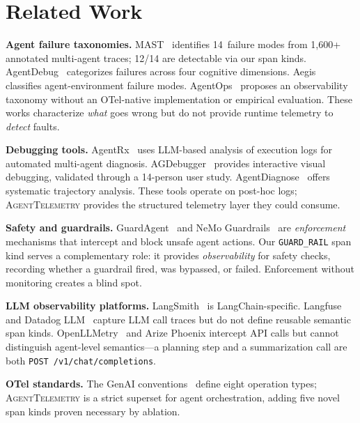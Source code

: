 \documentclass{article}
\begin{document}
\section{Related Work}
\label{sec:related}

\textbf{Agent failure taxonomies.}
MAST~\citep{mast} identifies 14~failure modes from 1,600+ annotated
multi-agent traces; 12/14 are detectable via our span kinds.
AgentDebug~\citep{agentdebug} categorizes failures across four
cognitive dimensions.  Aegis~\citep{aegis} classifies agent-environment
failure modes.  AgentOps~\citep{agentops} proposes an observability
taxonomy without an OTel-native implementation or empirical evaluation.
These works characterize \emph{what} goes wrong but do not provide
runtime telemetry to \emph{detect} faults.

\textbf{Debugging tools.}
AgentRx~\citep{agentrx} uses LLM-based analysis of execution logs for
automated multi-agent diagnosis.
AGDebugger~\citep{agdebugger} provides interactive visual debugging,
validated through a 14-person user study.
AgentDiagnose~\citep{agentdiagnose} offers systematic trajectory
analysis.  These tools operate on post-hoc logs;
\textsc{AgentTelemetry} provides the structured telemetry layer they
could consume.

\textbf{Safety and guardrails.}
GuardAgent~\citep{guardagent} and NeMo Guardrails~\citep{nemo_guardrails}
are \emph{enforcement} mechanisms that intercept and block unsafe agent
actions.  Our \texttt{GUARD\_RAIL} span kind serves a complementary
role: it provides \emph{observability} for safety checks, recording
whether a guardrail fired, was bypassed, or failed.  Enforcement
without monitoring creates a blind spot.

\textbf{LLM observability platforms.}
LangSmith~\citep{langsmith} is LangChain-specific.
Langfuse~\citep{langfuse} and Datadog LLM~\citep{datadog_llm} capture
LLM call traces but do not define reusable semantic span kinds.
OpenLLMetry~\citep{openllmetry} and Arize Phoenix intercept API calls
but cannot distinguish agent-level semantics---a planning step and a
summarization call are both \texttt{POST /v1/chat/completions}.

\textbf{OTel standards.}
The GenAI conventions~\citep{otel} define eight operation types;
\textsc{AgentTelemetry} is a strict superset for agent orchestration,
adding five novel span kinds proven necessary by ablation.
\end{document}
